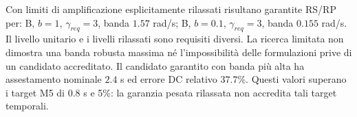 Con limiti di amplificazione esplicitamente rilassati risultano garantite RS/RP per: B, $b=1$, $\gamma_{req}=3$, banda $1.57$ rad/s; B, $b=0.1$, $\gamma_{req}=3$, banda $0.155$ rad/s. Il livello unitario e i livelli rilassati sono requisiti diversi. La ricerca limitata non dimostra una banda robusta massima né l'impossibilità delle formulazioni prive di un candidato accreditato. Il candidato garantito con banda più alta ha assestamento nominale $2.4$ s ed errore DC relativo $37.7$\%. Questi valori superano i target M5 di 0.8 s e 5\%: la garanzia pesata rilassata non accredita tali target temporali.
